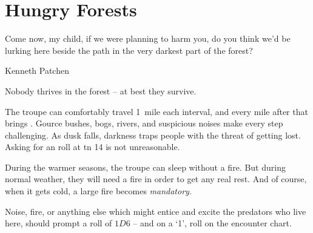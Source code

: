 \chapter{Hungry Forests}
\epigraph{Come now, my child, if we were planning to harm you, do you think we'd be lurking here beside the path in the very darkest part of the forest?}{Kenneth Patchen}

\noindent
Nobody thrives in the forest -- at best they survive.

The troupe can comfortably travel 1~mile each \gls{interval}, and every mile after that brings .%
Gource bushes, bogs, rivers, and suspicious noises make every step challenging.
As dusk falls, darkness traps people with the threat of getting lost.
Asking for an  roll at \gls{tn} 14 is not unreasonable.

During the warmer seasons, the troupe can sleep without a fire.
But during normal weather, they will need a fire in order to get any real rest.
And of course, when it gets cold, a large fire becomes \emph{mandatory}.

Noise, fire, or anything else which might entice and excite the predators who live here, should prompt a roll of $1D6$ -- and on a `1', roll on the encounter chart.%
